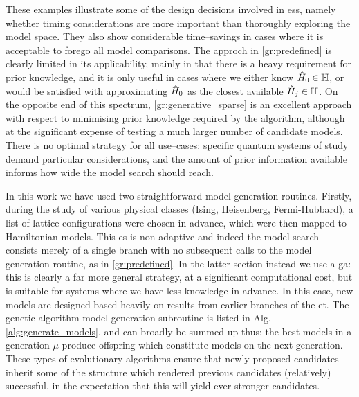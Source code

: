 These examples illustrate some of the design decisions involved in \gls{es}s, 
    namely whether timing considerations are more important than thoroughly exploring the model space.
They also show considerable time--savings in cases where it is
    acceptable to forego all model comparisons. 
The approch in \ref{gr:predefined} is clearly limited in its applicability, 
    mainly in that there is a heavy requirement for prior knowledge, 
    and it is only useful in cases where we either know $\hat{H}_0 \in \mathbb{H}$, 
    or would be satisfied with approximating $\hat{H}_0$ as the closest available $\hat{H}_j \in \mathbb{H}$. 
On the opposite end of this spectrum, \ref{gr:generative_sparse}  is an excellent approach
    with respect to minimising prior knowledge required by the algorithm, 
    although at the significant expense of testing a much larger number of candidate models. 
There is no optimal strategy for all use--cases: 
    specific quantum systems of study demand particular considerations, 
    and the amount of prior information available informs how wide the model search should reach. 

\par 

In this work we have used two straightforward model generation routines.
Firstly, during the study of various physical classes (Ising, Heisenberg, Fermi-Hubbard), 
    a list of lattice configurations were chosen in advance,
    which were then mapped to Hamiltonian models.
This \gls{es} is non-adaptive and indeed the model search
    consists merely of a single branch with no subsequent calls to the model generation routine, 
    as in \ref{gr:predefined}. 
In the latter section instead we use a \gls{ga}:
    this is clearly a far more general strategy, at a significant computational cost, 
    but is suitable for systems where we have less knowledge in advance. 
In this case, new models are designed based heavily on results from earlier branches of the \gls{et}. 
The genetic algorithm model generation subroutine is listed in Alg. \ref{alg:generate_models}, 
    and can broadly be summed up thus: 
    the best models in a generation $\mu$ produce offspring which constitute models on the next generation.
These types of evolutionary algorithms ensure that newly proposed candidates inherit 
    some of the structure which rendered previous candidates (relatively) successful, 
    in the expectation that this will yield ever-stronger candidates. 



